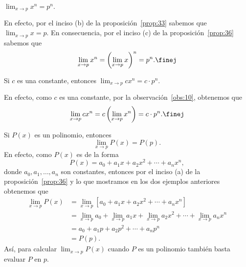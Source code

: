 \documentclass[12pt,a4paper]{book}
\begin{document}
    \begin{ejemplo}\label{ejm:46}
        $\lim_{x\to p}x^{n}=p^{n}$.

        En efecto, por el inciso (b) de la proposición~\ref{prop:33} sabemos que $\lim_{x\to p}x=p$.
        En consecuencia, por el inciso (c) de la proposición~\ref{prop:36} sabemos que
        \begin{equation*}
            \lim_{x\to p}x^{n}=\left(\lim_{x\to p}x\right)^{n}=p^{n}.\finej
        \end{equation*}
    \end{ejemplo}

    \begin{ejemplo}\label{ejm:47}
        Si $c$ es una constante, entonces $\lim_{x\to p}cx^{n}=c\cdot p^{n}$.

        En efecto, como $c$ es una constante, por la observación~\ref{obs:10}, obtenemos que
        \begin{equation*}
            \lim_{x\to p}cx^{n}=c\left(\lim_{x\to p}x^{n}\right)=c\cdot p^{n}.\finej
        \end{equation*}
    \end{ejemplo}

    \begin{ejemplo}\label{ejm:48}
        Si $P(x)$ es un polinomio, entonces
        \begin{equation*}
            \lim_{x\to p}P(x)=P(p).
        \end{equation*}
        En efecto, como $P(x)$ es de la forma
        \begin{equation*}
            P(x)=a_{0}+a_{1}x+a_{2}x^{2}+\cdots+a_{n}x^{n},
        \end{equation*}
        donde $a_{0},a_{1},\ldots,a_{n}$ son constantes, entonces por el inciso (a) de la proposición~\ref{prop:36}
        y lo que mostramos en los dos ejemplos anteriores obtenemos que
        \begin{align*}
            \lim_{x\to p}P(x)&=\lim_{x\to p}\left[a_{0}+a_{1}x+a_{2}x^{2}+\cdots+a_{n}x^{n}\right]\\
            &=\lim_{x\to p}a_{0}+\lim_{x\to p}a_{1}x+\lim_{x\to p}a_{2}x^{2}+\cdots+\lim_{x\to p}a_{n}x^{n}\\
            &=a_{0}+a_{1}p+a_{2}p^{2}+\cdots+a_{n}p^{n}\\
            &=P(p).
        \end{align*}
        Así, para calcular $\lim_{x\to p}P(x)$ cuando $P$ es un polinomio también basta
        evaluar $P$ en $p$.
    \end{ejemplo}
\end{document}
